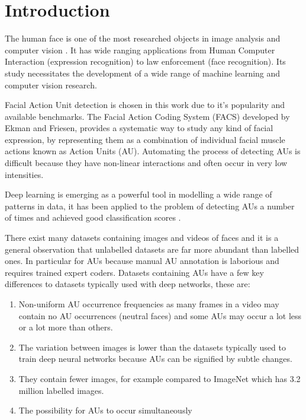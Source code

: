 \chapter{Introduction} \label{chap:intro}

  The human face is one of the most researched objects in image analysis
  and computer vision \cite{S.ZafeiriouA.PapaioannouI.KotsiaM.A.Nicolaou}.
  It has wide ranging applications from Human
  Computer Interaction (expression recognition) to law enforcement (face recognition).
  Its study necessitates the development of a wide range of machine
  learning and computer vision research.

  Facial Action Unit detection \cite{Corneanu2016} is chosen in this work due
  to it's popularity and available benchmarks.
  The Facial Action Coding System (FACS) developed by Ekman and Friesen,
  provides a systematic way to study any kind of facial expression,
  by representing them as a combination of individual facial muscle actions
  known as Action Units (AU). Automating the process of detecting AUs is difficult
  because they have non-linear interactions \cite{S.EleftheriadisO.Rudovic}
  and often occur in very low intensities.

  Deep learning is emerging as a powerful tool in modelling a wide range of patterns
  in data, it has been applied to the problem of detecting AUs a number of times and achieved
  good classification scores \cite{Khorrami2015,Jaiswal2016,Kim2016,Gudi2015,Ghosh2015}.

  There exist many datasets containing images and videos of faces and it is a general
  observation that unlabelled datasets are far more abundant than labelled ones.
  In particular for AUs because manual AU
  annotation is laborious and requires trained expert coders.
  Datasets containing AUs have a few key differences to datasets typically used with
  deep networks, these are:
  \begin{enumerate}
    \item Non-uniform AU occurrence frequencies as many frames in a video may
    contain no AU occurrences (neutral faces) and some AUs may occur a lot less or a lot more than others.
    \item The variation between images is lower than the datasets typically used
    to train deep neural networks because AUs can be signified by subtle changes.
    \item They contain fewer images, for example compared to ImageNet\cite{Deng2009} which has 3.2 million labelled images.
    \item The possibility for AUs to occur simultaneously
  \end{enumerate}

